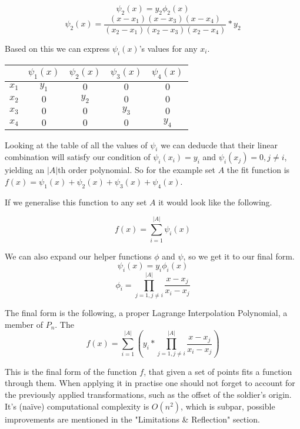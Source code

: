 \documentclass[12pt, titlepage]{article}
\begin{document}
\begin{equation}
    \psi_2(x) = y_2 \phi_2(x)
\end{equation}
\begin{equation}
    \psi_2(x) = \frac{(x - x_1)(x - x_3)(x - x_4)}{(x_2 - x_1)(x_2 - x_3)(x_2 - x_4)} * y_2
\end{equation}

Based on this we can express $\psi_i(x)$'s values for any $x_i$.

{
\centering
\begin{tabular}{c|c c c c}
    & $\psi_1(x) $ & $\psi_2(x)$ & $\psi_3(x)$ & $\psi_4(x)$ \\
    \hline
    $x_1$ & $y_1$ & $0$ & $0$ & $0$ \\
    $x_2$ & $0$ & $y_2$ & $0$ & $0$ \\
    $x_3$ & $0$ & $0$ & $y_3$ & $0$ \\
    $x_4$ & $0$ & $0$ & $0$ & $y_4$ \\
\end{tabular}\par
}

Looking at the table of all the values of $\psi_i$ we can deducde that their linear
combination will satisfy our condition of $\psi_i(x_i) = y_i$ and 
$\psi_i(x_j) = 0, j \neq i$, yielding an $|A|$th order polynomial. 
So for the example set $A$ the fit function is 
$f(x) = \psi_1(x) + \psi_2(x) + \psi_3(x) + \psi_4(x)$.

If we generalise this function to any set $A$ it would look
like the following.

\begin{equation}
    f(x) = \sum_{i=1}^{|A|}\psi_i(x)
\end{equation}

We can also expand our helper functions $\phi$ and $\psi$, so we get it to our 
final form.
$$\psi_i(x) = y_i \phi_i(x)$$
\begin{equation}
    \phi_i = \prod_{j=1, j \neq i}^{|A|}\frac{x - x_j}{x_i - x_j}
\end{equation}

The final form is the following, a proper Lagrange Interpolation Polynomial,
a member of $P_n$. The 
\begin{equation}
f(x) = \sum_{i=1}^{|A|} \left(y_i * \prod_{j=1, j \neq i}^{|A|} \frac{x - x_j}{x_i - x_j}\right)
\end{equation}

This is the final form of the function $f$, that given a set of points 
fits a function through them. When applying it in practise one should 
not forget to account for the previously applied transformations, such as 
the offset of the soldier's origin. It's (na\"ive) computational complexity
is $O(n^2)$, which is subpar, possible improvements are mentioned in the 
"Limitations \& Reflection" section.
\end{document}
